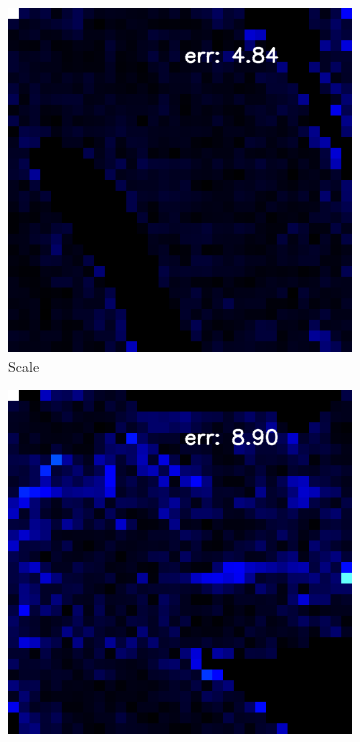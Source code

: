 \begin{figure}[H]
	\begin{subfigure}[b]{0.18\linewidth}
		\includegraphics[width=\linewidth]{./Figures/trip_net_zoom_in/eval_7_22_-8_error.png}
		\caption{Scale}
	\end{subfigure}
	\begin{subfigure}[b]{0.18\linewidth}
		\includegraphics[width=\linewidth]{./Figures/trip_net_zoom_in/eval_7_2_22_error.png}

\end{subfigure}
\end{figure}
